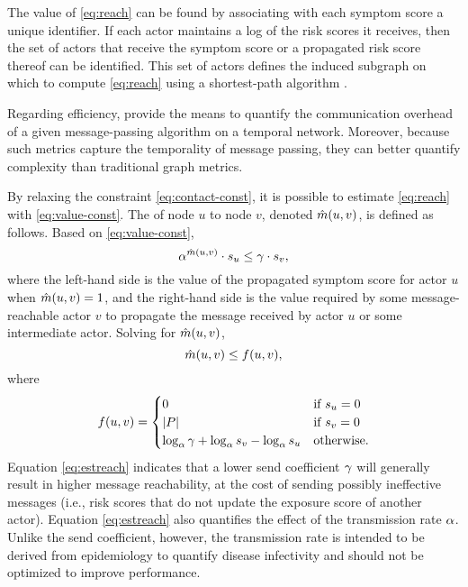 The value of \eqref{eq:reach} can be found by associating with each symptom score a unique identifier. If each actor maintains a log of the risk scores it receives, then the set of actors that receive the symptom score or a propagated risk score thereof can be identified. This set of actors defines the induced subgraph on which to compute \eqref{eq:reach} using a shortest-path algorithm \citep{Johnson1977}. 

Regarding efficiency,  provide the means to quantify the communication overhead of a given message-passing algorithm on a temporal network. Moreover, because such metrics capture the temporality of message passing, they can better quantify complexity than traditional graph metrics.

By relaxing the constraint \eqref{eq:contact-const}, it is possible to estimate \eqref{eq:reach} with \eqref{eq:value-const}. The  of node $u$ to node $v$, denoted $\hat{m}(u, v)$, is defined as follows. Based on \eqref{eq:value-const},
\begin{equation*}
  \alpha^{\hat{m}(u, v)} \cdot s_u \leq \gamma \cdot s_v,
\end{equation*}
where the left-hand side is the value of the propagated symptom score for actor $u$ when $\hat{m}(u, v) = 1$, and the right-hand side is the value required by some message-reachable actor $v$ to propagate the message received by actor $u$ or some intermediate actor. Solving for $\hat{m}(u, v)$,
\begin{equation}\label{eq:estreach}
  \hat{m}(u, v) \leq f(u, v),
\end{equation}
where
\begin{equation*}
  f(u, v) = 
  \begin{cases} 
    0 & \text{if $s_u = 0$} \\
    \left\vert P \right\vert & \text{if $s_v = 0$} \\
    \log_{\alpha}\gamma + \log_{\alpha}s_v - \log_{\alpha}s_u & \text{otherwise.}
  \end{cases}
\end{equation*}
Equation \eqref{eq:estreach} indicates that a lower send coefficient $\gamma$ will generally result in higher message reachability, at the cost of sending possibly ineffective messages (i.e., risk scores that do not update the exposure score of another actor). Equation \eqref{eq:estreach} also quantifies the effect of the transmission rate $\alpha$. Unlike the send coefficient, however, the transmission rate is intended to be derived from epidemiology to quantify disease infectivity and should not be optimized to improve performance.

